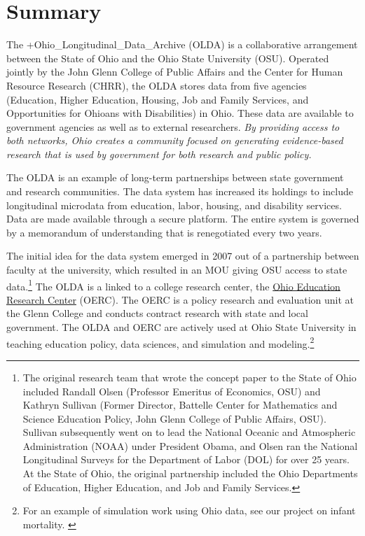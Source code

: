 \documentclass[
]{book}
\begin{document}
\hypertarget{summary-2}{%
\section{Summary}\label{summary-2}}

The +Ohio\_Longitudinal\_Data\_Archive\textbar{} (OLDA) is a collaborative arrangement between the State of Ohio and the Ohio State University (OSU). Operated jointly by the John Glenn College of Public Affairs and the Center for Human Resource Research (CHRR), the OLDA stores data from five agencies (Education, Higher Education, Housing, Job and Family Services, and Opportunities for Ohioans with Disabilities) in Ohio. These data are available to government agencies as well as to external researchers. \emph{By providing access to both networks, Ohio creates a community focused on generating evidence-based research that is {used} by government for both research and public policy.}

The OLDA is an example of long-term partnerships between state government and research communities. The data system has increased its holdings to include longitudinal microdata from education, labor, housing, and disability services. Data are made available through a secure platform. The entire system is governed by a memorandum of understanding that is renegotiated every two years.

The initial idea for the data system emerged in 2007 out of a partnership between faculty at the university, which resulted in an MOU giving OSU access to state data.\footnote{The original research team that wrote the concept paper to the State of Ohio included Randall Olsen (Professor Emeritus of Economics, OSU) and Kathryn Sullivan (Former Director, Battelle Center for Mathematics and Science Education Policy, John Glenn College of Public Affairs, OSU). Sullivan subsequently went on to lead the National Oceanic and Atmospheric Administration (NOAA) under President Obama, and Olsen ran the National Longitudinal Surveys for the Department of Labor (DOL) for over 25 years. At the State of Ohio, the original partnership included the Ohio Departments of Education, Higher Education, and Job and Family Services.} The OLDA is a linked to a college research center, the \href{\%5Bwww.oerc.osu.edu\%5D(http://www.oerc.osu.edu/)}{Ohio Education Research Center} (OERC). The OERC is a policy research and evaluation unit at the Glenn College and conducts contract research with state and local government. The OLDA and OERC are actively used at Ohio State University in teaching education policy, data sciences, and simulation and modeling.\footnote{For an example of simulation work using Ohio data, see our project on infant mortality. \citep{hosseinichimeh2017}}
\end{document}
